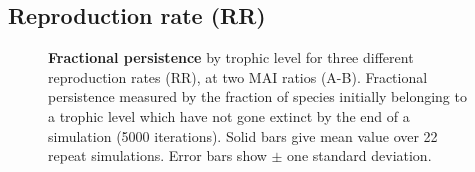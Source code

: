 \newpage
\subsection{Reproduction rate (RR)}
\label{sec:rr_v_p}

\begin{figure}
	\centering	
	\setlength{\subfloatlabelskip}{0pt}
	\caption{\textbf{Fractional persistence} by trophic level for three different reproduction rates (RR), at two MAI ratios (A-B). Fractional persistence measured by the fraction of species initially belonging to a trophic level which have not gone extinct by the end of a simulation (5000 iterations). Solid bars give mean value over 22 repeat simulations. Error bars show $\pm$ one standard deviation.}
	\label{fig:rr_histograms}
\end{figure}


